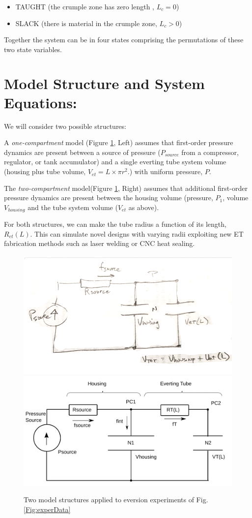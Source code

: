 \documentclass[letterpaper]{article}
\begin{document}
\begin{itemize}
  \item TAUGHT (the crumple zone has zero length , $L_c = 0 $)
  \item SLACK (there is material in the crumple zone, $L_c > 0$)
\end{itemize}

Together the system can be in four states comprising the permutations
of these two state variables.

\section{Model Structure and System Equations:}

We will consider two possible structures:

A {\it one-compartment} model (Figure \ref{Fig:TwoStructures}, Left)
assumes that first-order pressure dynamics are present between a source of   pressure  ($P_{source}$ from a compressor, regulator, or tank accumulator)
and a single  everting tube system volume (housing plus tube volume, $V_{et} = L\times \pi r^2$.) with uniform pressure, $P$.

The {\it two-compartment} model(Figure \ref{Fig:TwoStructures}, Right)
assumes that additional first-order pressure dynamics are present between
the housing volume (pressure, $P_1$, volume $V_{housing}$ and the tube system volume ($V_{et}$ as above).

For both structures, we can make the tube radius a function of its length, $R_{et}(L)$.   This can simulate novel designs with varying
radii exploiting new ET
fabrication methods such as laser welding or CNC heat sealing.

\begin{figure}[h]\centering
\includegraphics[width=.475\textwidth]{Photo_OneCompartment.png}
\includegraphics[width=.475\textwidth]{Figure_TwoCompartment.png}
\caption{Two model structures applied to eversion experiments of
Fig. \ref{Fig:experData} }\label{Fig:TwoStructures}
\end{figure}
\end{document}
